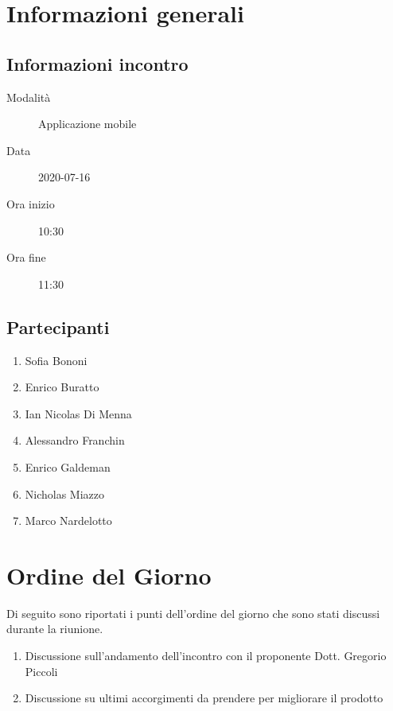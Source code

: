 \documentclass{article}
\begin{document}


\section{Informazioni generali}%
\label{sec:informazioni_generali}

\subsection{Informazioni incontro}%
\label{sub:informazioni_incontro}

\begin{description}
  \item[Modalità] Applicazione mobile 
  \item[Data] 2020-07-16
  \item[Ora inizio] 10:30
  \item[Ora fine] 11:30
\end{description}

\subsection{Partecipanti}%
\label{sub:partecipanti}

\begin{enumerate}
  \item Sofia Bononi
  \item Enrico Buratto
  \item Ian Nicolas Di Menna
  \item Alessandro Franchin
  \item Enrico Galdeman
  \item Nicholas Miazzo
  \item Marco Nardelotto
\end{enumerate}

\section{Ordine del Giorno}%
\label{ordine_del_giorno}
Di seguito sono riportati i punti dell'ordine del giorno che sono stati discussi durante la riunione.
\begin{enumerate}
  \item Discussione sull'andamento dell'incontro con il proponente Dott. Gregorio Piccoli
  \item Discussione su ultimi accorgimenti da prendere per migliorare il prodotto
\end{enumerate}
\end{document}
